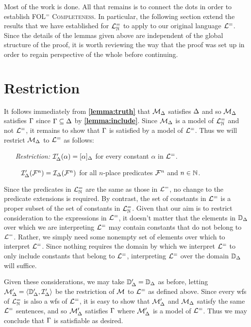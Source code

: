 Most of the work is done.
All that remains is to connect the dots in order to establish \textsc{FOL$^=$ Completeness}.
In particular, the following section extend the results that we have established for $\mathcal{L}^{=}_{\mathbb{N}}$ to apply to our original language $\mathcal{L}^{=}$.
Since the details of the lemmas given above are independent of the global structure of the proof, it is worth reviewing the way that the proof was set up in order to regain perspective of the whole before continuing.




\section{Restriction}%
  \label{sub:Restriction}
 
It follows immediately from \textbf{\ref{lemma:truth}} that $\mathcal{M}_{\Delta}$ satisfies $\Delta$ and so $\mathcal{M}_{\Delta}$ satisfies $\Gamma$ since $\Gamma\subseteq\Delta$ by \textbf{\ref{lemma:include}}. 
Since $\mathcal{M}_{\Delta}$ is a model of $\mathcal{L}^{=}_{\mathbb{N}}$ and not $\mathcal{L}^{=}$, it remains to show that $\Gamma$ is satisfied by a model of $\mathcal{L}^{=}$.
Thus we will restrict $\mathcal{M}_{\Delta}$ to $\mathcal{L}^{=}$ as follows: 
  \begin{enumerate}[leftmargin=1.5in]
    \item[\it Restriction:] $\mathcal{I}'_{\Delta}(\alpha)=[\alpha]_{\Delta}$ for every constant $\alpha$ in $\mathcal{L}^{=}$.
    \item[~] $\mathcal{I}'_{\Delta}(\mathcal{F}^n)=\mathcal{I}_{\Delta}(\mathcal{F}^n)$ for all $n$-place predicates $\mathcal{F}^n$ and $n\in\mathbb{N}$. 
  \end{enumerate}
Since the predicates in $\mathcal{L}^{=}_{\mathbb{N}}$ are the same as those in $\mathcal{L}^{=}$, no change to the predicate extensions is required.
By contrast, the set of constants in $\mathcal{L}^{=}$ is a proper subset of the set of constants in $\mathcal{L}^{=}_{\mathbb{N}}$. 
Given that our aim is to restrict consideration to the expressions in $\mathcal{L}^{=}$, it doesn't matter that the elements in $\mathbb{D}_{\Delta}$ over which we are interpreting $\mathcal{L}^{=}$ may contain constants that do not belong to $\mathcal{L}^{=}$.
Rather, we simply need some nonempty set of elements over which to interpret $\mathcal{L}^{=}$.
Since nothing requires the domain by which we interpret $\mathcal{L}^{=}$ to only include constants that belong to $\mathcal{L}^{=}$, interpreting $\mathcal{L}^{=}$ over the domain $\mathbb{D}_{\Delta}$ will suffice.

Given these considerations, we may take $\mathbb{D}'_{\Delta}=\mathbb{D}_{\Delta}$ as before, letting $\mathcal{M}'_{\Delta}=\langle\mathbb{D}'_{\Delta},\mathcal{I}'_{\Delta}\rangle$ be the restriction of $\mathcal{M}$ to $\mathcal{L}^{=}$ as defined above. 
Since every wfs of $\mathcal{L}^{=}_{\mathbb{N}}$ is also a wfs of $\mathcal{L}^{=}$, it is easy to show that $\mathcal{M}'_{\Delta}$ and $\mathcal{M}_{\Delta}$ satisfy the same $\mathcal{L}^{=}$ sentences, and so $\mathcal{M}'_{\Delta}$ satisfies $\Gamma$ where $\mathcal{M}'_{\Delta}$ is a model of $\mathcal{L}^{=}$. 
Thus we may conclude that $\Gamma$ is satisfiable as desired. 

